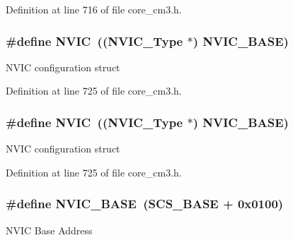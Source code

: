 Definition at line 716 of file core\+\_\+cm3.\+h.

\subsubsection[{\texorpdfstring{N\+V\+IC}{NVIC}}]{\setlength{\rightskip}{0pt plus 5cm}\#define N\+V\+IC~(({\bf N\+V\+I\+C\+\_\+\+Type} $\ast$)          {\bf N\+V\+I\+C\+\_\+\+B\+A\+SE})}\hypertarget{group___c_m_s_i_s___c_m3__core__register_gac8e97e8ce56ae9f57da1363a937f8a17}{}\label{group___c_m_s_i_s___c_m3__core__register_gac8e97e8ce56ae9f57da1363a937f8a17}
N\+V\+IC configuration struct 

Definition at line 725 of file core\+\_\+cm3.\+h.

\subsubsection[{\texorpdfstring{N\+V\+IC}{NVIC}}]{\setlength{\rightskip}{0pt plus 5cm}\#define N\+V\+IC~(({\bf N\+V\+I\+C\+\_\+\+Type} $\ast$)          {\bf N\+V\+I\+C\+\_\+\+B\+A\+SE})}\hypertarget{group___c_m_s_i_s___c_m3__core__register_gac8e97e8ce56ae9f57da1363a937f8a17}{}\label{group___c_m_s_i_s___c_m3__core__register_gac8e97e8ce56ae9f57da1363a937f8a17}
N\+V\+IC configuration struct 

Definition at line 725 of file core\+\_\+cm3.\+h.

\subsubsection[{\texorpdfstring{N\+V\+I\+C\+\_\+\+B\+A\+SE}{NVIC_BASE}}]{\setlength{\rightskip}{0pt plus 5cm}\#define N\+V\+I\+C\+\_\+\+B\+A\+SE~({\bf S\+C\+S\+\_\+\+B\+A\+SE} +  0x0100)}\hypertarget{group___c_m_s_i_s___c_m3__core__register_gaa0288691785a5f868238e0468b39523d}{}\label{group___c_m_s_i_s___c_m3__core__register_gaa0288691785a5f868238e0468b39523d}
N\+V\+IC Base Address 

